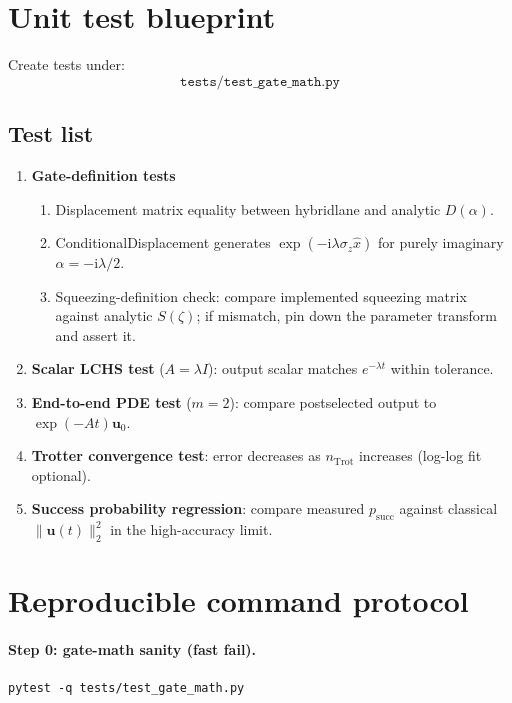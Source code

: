 \documentclass[11pt]{article}
\newcommand{\ii}{\mathrm{i}}
\begin{document}
\section{Unit test blueprint}

Create tests under:
\[
\texttt{tests/test\_gate\_math.py}
\]

\subsection*{Test list}
\begin{enumerate}[itemsep=3pt,topsep=3pt]
\item \textbf{Gate-definition tests}
\begin{enumerate}[itemsep=2pt,topsep=2pt]
\item Displacement matrix equality between hybridlane and analytic $D(\alpha)$.
\item ConditionalDisplacement generates $\exp(-\ii\lambda \sigma_z \hat{x})$ for purely imaginary $\alpha=-\ii\lambda/2$.
\item Squeezing-definition check: compare implemented squeezing matrix against analytic $S(\zeta)$; if mismatch, pin down the parameter transform and assert it.
\end{enumerate}
\item \textbf{Scalar LCHS test} ($A=\lambda I$): output scalar matches $e^{-\lambda t}$ within tolerance.
\item \textbf{End-to-end PDE test} ($m=2$): compare postselected output to $\exp(-At)\mathbf u_0$.
\item \textbf{Trotter convergence test}: error decreases as $n_{\mathrm{Trot}}$ increases (log-log fit optional).
\item \textbf{Success probability regression}: compare measured $p_{\mathrm{succ}}$ against classical $\|\mathbf u(t)\|_2^2$ in the high-accuracy limit.
\end{enumerate}

\section{Reproducible command protocol}
\paragraph{Step 0: gate-math sanity (fast fail).}
\begin{verbatim}
pytest -q tests/test_gate_math.py
\end{verbatim}
\end{document}
